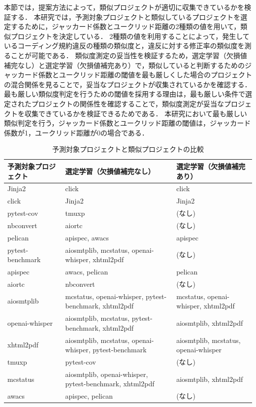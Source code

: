 \documentclass[11pt]{jreport}
\begin{document}
本節では，提案方法によって，類似プロジェクトが適切に収集できているかを検証する．
本研究では，予測対象プロジェクトと類似しているプロジェクトを選定するために，ジャッカード係数とユークリッド距離の2種類の値を用いて，類似プロジェクトを決定している．
2種類の値を利用することによって，発生しているコーディング規約違反の種類の類似度と，違反に対する修正率の類似度を測ることが可能である．
類似度測定の妥当性を検証するため，選定学習（欠損値補完なし）と選定学習（欠損値補完あり）で，類似していると判断するためのジャッカード係数とユークリッド距離の閾値を最も厳しくした場合のプロジェクトの混合関係を見ることで，妥当なプロジェクトが収集されているかを確認する．
最も厳しい類似度判定を行うための閾値を採用する理由は，最も厳しい条件で選定されたプロジェクトの関係性を確認することで，類似度測定が妥当なプロジェクトを収集できているかを検証できるためである．
本研究において最も厳しい類似判定を行う，ジャッカード係数とユークリッド距離の閾値は，ジャッカード係数が1，ユークリッド距離が0の場合である．


\begin{table}[htbp]
    \centering
    \caption{予測対象プロジェクトと類似プロジェクトの比較}
    \label{tab:merged_projects}
    \begin{tabularx}{\textwidth}{l p{3cm} p{3cm}}
        \toprule
        \textbf{予測対象プロジェクト} & \textbf{選定学習（欠損値補完なし）} & \textbf{選定学習（欠損値補完あり）} \\
        \midrule
        Jinja2 & click & click \\
        click & Jinja2 & Jinja2 \\
        pytest-cov & tmuxp & (なし) \\
        nbconvert & aiortc & (なし) \\
        pelican & apispec, awacs & apispec \\
        pytest-benchmark & aiosmtplib, mcstatus, openai-whisper, xhtml2pdf & (なし) \\
        apispec & awacs, pelican & pelican \\
        aiortc & nbconvert & (なし) \\
        aiosmtplib & mcstatus, openai-whisper, pytest-benchmark, xhtml2pdf & mcstatus, openai-whisper, xhtml2pdf \\
        openai-whisper & aiosmtplib, mcstatus, pytest-benchmark, xhtml2pdf & aiosmtplib, xhtml2pdf \\
        xhtml2pdf & aiosmtplib, mcstatus, openai-whisper, pytest-benchmark & aiosmtplib, mcstatus, openai-whisper \\
        tmuxp & pytest-cov & (なし) \\
        mcstatus & aiosmtplib, openai-whisper, pytest-benchmark, xhtml2pdf & aiosmtplib, xhtml2pdf \\
        awacs & apispec, pelican & (なし) \\
        \bottomrule
    \end{tabularx}
\end{table}
\end{document}
